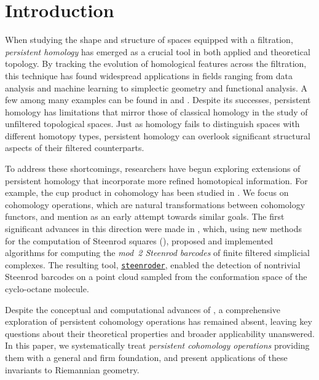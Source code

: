 
\section{Introduction} \label{s:introduction}

When studying the shape and structure of spaces equipped with a filtration, \textit{persistent homology} has emerged as a crucial tool in both applied and theoretical topology.
By tracking the evolution of homological features across the filtration, this technique has found widespread applications in fields ranging from data analysis and machine learning to simplectic geometry and functional analysis.
A few among many examples can be found in \cite{carlsson2013viral,hess2017nano} and \cite{polterovich2020persistence,medina2022fuct_top}.
Despite its successes, persistent homology has limitations that mirror those of classical homology in the study of unfiltered topological spaces.
Just as homology fails to distinguish spaces with different homotopy types, persistent homology can overlook significant structural aspects of their filtered counterparts.

To address these shortcomings, researchers have begun exploring extensions of persistent homology that incorporate more refined homotopical information.
For example, the cup product in cohomology has been studied in \cite{contessoto_et_al:LIPIcs.SoCG.2022.31, memoli2024persistent, huang2005cup, yarmola2010persistence, herscovich2018higher, belchi2021a, contreras2022persistent}.
We focus on cohomology operations, which are natural transformations between cohomology functors, and mention \cite{aubrey2011thesis} as an early attempt towards similar goals.
The first significant advances in this direction were made in \cite{medina2022per_st}, which, using new methods for the computation of Steenrod squares (\cite{medina2023fast_sq}), proposed and implemented algorithms for computing the \textit{mod~2 Steenrod barcodes} of finite filtered simplicial complexes.
The resulting tool, \href{https://steenroder.github.io/steenroder/}{\texttt{steenroder}}, enabled the detection of nontrivial Steenrod barcodes on a point cloud sampled from the conformation space of the cyclo-octane molecule.

Despite the conceptual and computational advances of \cite{medina2022per_st}, a comprehensive exploration of persistent cohomology operations has remained absent, leaving key questions about their theoretical properties and broader applicability unanswered.
In this paper, we systematically treat \textit{persistent cohomology operations} providing them with a general and firm foundation, and present applications of these invariants to Riemannian geometry.


